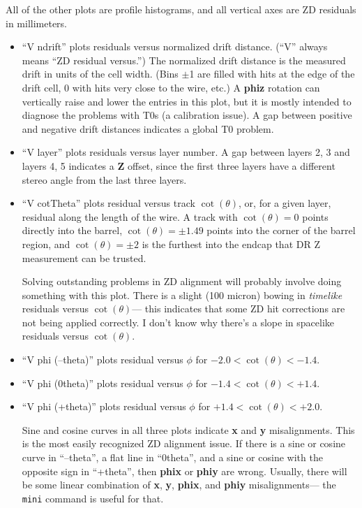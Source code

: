 \documentclass[12pt]{article}
\begin{document}
All of the other plots are profile histograms, and all vertical axes
are ZD residuals in millimeters.
\begin{itemize}

  \item ``V ndrift'' plots residuals versus normalized drift distance.
  (``V'' always means ``ZD residual versus.'')  The normalized drift
  distance is the measured drift in units of the cell width.  (Bins
  $\pm$1 are filled with hits at the edge of the drift cell, 0 with
  hits very close to the wire, etc.)  A {\bf phiz} rotation can
  vertically raise and lower the entries in this plot, but it is
  mostly intended to diagnose the problems with T0s (a calibration
  issue).  A gap between positive and negative drift distances
  indicates a global T0 problem.

  \item ``V layer'' plots residuals versus layer number.  A gap
  between layers 2, 3 and layers 4, 5 indicates a {\bf Z} offset,
  since the first three layers have a different stereo angle from the
  last three layers.

  \item ``V cotTheta'' plots residual versus track $\cot(\theta)$,
  or, for a given layer, residual along the length of the wire.  A
  track with $\cot(\theta) = 0$ points directly into the barrel,
  $\cot(\theta) = \pm 1.49$ points into the corner of the barrel
  region, and $\cot(\theta) = \pm 2$ is the furthest into the endcap
  that DR Z measurement can be trusted.

  Solving outstanding problems in ZD alignment will probably involve
  doing something with this plot.  There is a slight (100 micron)
  bowing in {\it timelike} residuals versus $\cot(\theta)$--- this
  indicates that some ZD hit corrections are not being applied
  correctly.  I don't know why there's a slope in spacelike residuals
  versus $\cot(\theta)$.

  \item ``V phi (--theta)'' plots residual versus $\phi$ for $-2.0 <
  \cot(\theta) < -1.4$.
  \item ``V phi (0theta)'' plots residual versus $\phi$ for $-1.4 <
  \cot(\theta) < +1.4$.
  \item ``V phi (+theta)'' plots residual versus $\phi$ for $+1.4 <
  \cot(\theta) < +2.0$.

  Sine and cosine curves in all three plots indicate {\bf x} and {\bf
  y} misalignments.  This is the most easily recognized ZD alignment
  issue.  If there is a sine or cosine curve in ``--theta'', a flat
  line in ``0theta'', and a sine or cosine with the opposite sign in
  ``+theta'', then {\bf phix} or {\bf phiy} are wrong.  Usually,
  there will be some linear combination of {\bf x}, {\bf y},
  {\bf phix}, and {\bf phiy} misalignments--- the {\tt mini} command
  is useful for that.

\end{itemize}
\end{document}
